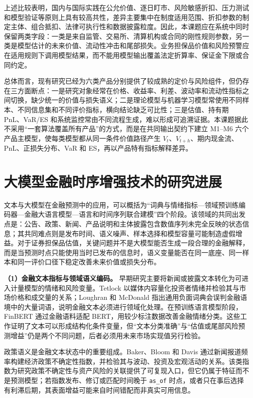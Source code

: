 上述比较表明，国内与国际实践在公允价值、逐日盯市、风险敏感折扣、压力测试和模型验证等原则上具有较高共性，差异主要集中在制度适用范围、折扣参数的制定主体、组合抵扣、法律可执行性和数据披露粒度。因此，本课题应在系统中同时保留两类字段：一类是来自监管、交易所、清算机构或合同的刚性规则参数，另一类是模型估计的未来价值、流动性冲击和尾部损失。业务担保品价值和风险预警应在适用规则下调用模型结果，而不能用模型输出覆盖法定折算率、保证金下限或合同约定。

总体而言，现有研究已经为六类产品分别提供了较成熟的定价与风险组件，但仍存在三方面断点：一是研究对象经常在价格、收益率、利差、波动率和流动性指标之间切换，缺少统一的价值与损失语义；二是理论模型与机器学习模型常使用不同样本、不同信息集和不同评价指标，横向结论缺乏可比性；三是估值、持有期 PnL、VaR/ES 和系统监控常由不同流程生成，难以形成可追溯证据。本课题据此不采用“一套算法覆盖所有产品”的方式，而是在共同输出契约下建立 M1--M6 六个产品主模型，使每类模型都从同一条件价值路径产生 \(V_t\)、\(V_{t+h}\)、期内现金流、PnL、正损失分布、VaR 和 ES，再以产品特有指标解释差异。

\section{大模型金融时序增强技术的研究进展}

文本与大模型在金融预测中的应用，可以概括为“词典与情绪指标—领域预训练编码器—金融大语言模型—语言和时间序列联合建模”四个阶段。该领域的共同出发点是：公告、政策、新闻、产品说明和主体披露包含数值序列未完全反映的状态信息；其共同难点则是发布时间、语义噪声、样本选择和模型容量可能制造虚假增益。对于证券担保品估值，关键问题并不是大模型能否生成一段合理的金融解释，而是当预测时点只能使用当时已发布的信息时，语义变量能否在同一底座、同一样本和同一评价口径下稳定改善未来价值或损失分布。

\textbf{（1）金融文本指标与领域语义编码。}
早期研究主要将新闻或披露文本转化为可进入计量模型的情绪和风险变量。Tetlock 以媒体内容量化投资者情绪并检验其与市场价格和成交量的关系\cite{tetlock_2007}；Loughran 和 McDonald 指出通用负面词典会误判金融语境中的大量词语，说明金融文本必须进行领域化处理\cite{loughran_mcdonald_2011}。在预训练语言模型阶段，FinBERT 通过金融语料适配 BERT，用较少标注数据改善金融情绪分类\cite{araci_2019_finbert}。这些工作证明了文本可以形成结构化条件变量，但“文本分类准确”与“估值或尾部风险预测增益”仍是两个不同问题，后者必须用未来市场实现值另行检验。

政策语义是金融文本状态中的重要组成。Baker、Bloom 和 Davis 通过新闻报道频率构建经济政策不确定性指数，并检验其与波动、投资及宏观活动的关系\cite{baker_2016_epu}。该类指数为研究政策不确定性与资产风险的关联提供了可复现入口，但它仍属于特征而不是预测模型；若指数发布、修订或匹配时间晚于 \texttt{as\_of} 时点，或者只在事后选择有利滞后期，其表面增益可能来自时间错配而非真实可用信息。

